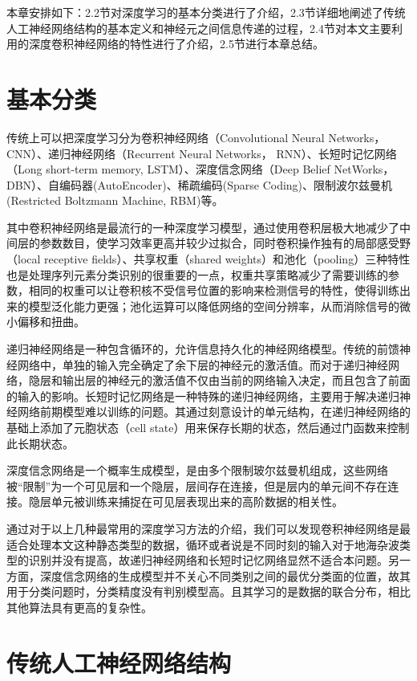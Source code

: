 本章安排如下：2.2节对深度学习的基本分类进行了介绍，2.3节详细地阐述了传统人工神经网络结构的基本定义和神经元之间信息传递的过程，2.4节对本文主要利用的深度卷积神经网络的特性进行了介绍，2.5节进行本章总结。


\section{基本分类}
传统上可以把深度学习分为卷积神经网络（Convolutional Neural Networks， CNN）、递归神经网络（Recurrent Neural Networks， RNN）、长短时记忆网络（Long short-term memory, LSTM）、深度信念网络（Deep Belief NetWorks，DBN）、自编码器(AutoEncoder)、稀疏编码(Sparse Coding)、限制波尔兹曼机(Restricted Boltzmann Machine, RBM)等。

其中卷积神经网络是最流行的一种深度学习模型，通过使用卷积层极大地减少了中间层的参数数目，使学习效率更高并较少过拟合，同时卷积操作独有的局部感受野（local receptive fields）、共享权重（shared weights）和池化（pooling）三种特性也是处理序列元素分类识别的很重要的一点，权重共享策略减少了需要训练的参数，相同的权重可以让卷积核不受信号位置的影响来检测信号的特性，使得训练出来的模型泛化能力更强；池化运算可以降低网络的空间分辨率，从而消除信号的微小偏移和扭曲。

递归神经网络是一种包含循环的，允许信息持久化的神经网络模型。传统的前馈神经网络中，单独的输入完全确定了余下层的神经元的激活值。而对于递归神经网络，隐层和输出层的神经元的激活值不仅由当前的网络输入决定，而且包含了前面的输入的影响。长短时记忆网络是一种特殊的递归神经网络，主要用于解决递归神经网络前期模型难以训练的问题。其通过刻意设计的单元结构，在递归神经网络的基础上添加了元胞状态（cell state）用来保存长期的状态，然后通过门函数来控制此长期状态。

深度信念网络是一个概率生成模型，是由多个限制玻尔兹曼机组成，这些网络被“限制”为一个可见层和一个隐层，层间存在连接，但是层内的单元间不存在连接。隐层单元被训练来捕捉在可见层表现出来的高阶数据的相关性。

通过对于以上几种最常用的深度学习方法的介绍，我们可以发现卷积神经网络是最适合处理本文这种静态类型的数据，循环或者说是不同时刻的输入对于地海杂波类型的识别并没有提高，故递归神经网络和长短时记忆网络显然不适合本问题。另一方面，深度信念网络的生成模型并不关心不同类别之间的最优分类面的位置，故其用于分类问题时，分类精度没有判别模型高。且其学习的是数据的联合分布，相比其他算法具有更高的复杂性。

\section{传统人工神经网络结构}

